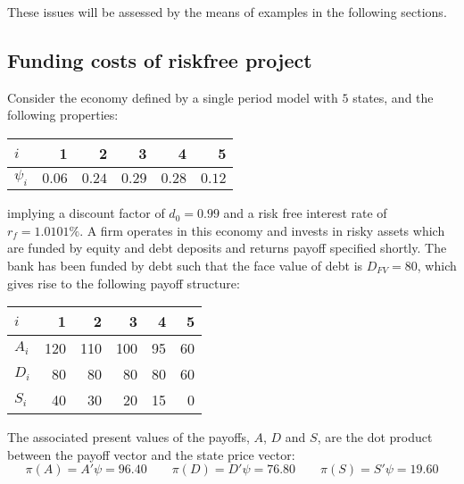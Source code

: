 \documentclass[../main.tex]{subfiles}
\begin{document}
        These issues will be assessed by the means of examples in the following sections.

    \subsection{Funding costs of riskfree project}
        Consider the economy defined by a single period model with $5$ states, and the following properties:
            \begin{table}[H]
                \centering
                \begin{tabular}{l|rrrrr}
                    $i$ & 1 & 2 & 3 & 4 & 5 \\
                    \hline
                    $\psi_{i}$ & $0.06$ & $0.24$ & $0.29$ & $0.28$ & $0.12$ \\
                \end{tabular}
            \end{table}
        implying a discount factor of $d_{0} = 0.99$ and a risk free interest rate of $r_{f} = 1.0101\%$. A firm operates in this economy and invests in risky assets which are funded by equity and debt deposits and returns payoff specified shortly. The bank has been funded by debt such that the face value of debt is $D_{FV} = 80$, which gives rise to the following payoff structure:
        \begin{table}[H]
            \centering
            \begin{tabular}{l|rrrrr}
                $i$ & 1 & 2 & 3 & 4 & 5 \\
                \hline
                $A_{i}$ & 120 & 110 & 100 & 95 & 60 \\
                $D_{i}$ & 80 & 80 & 80 & 80 & 60 \\
                $S_{i}$ & 40 & 30 & 20 & 15 & 0
            \end{tabular}
        \end{table}
        The associated present values of the payoffs, $A$, $D$ and $S$, are the dot product between the payoff vector and the state price vector:
            \begin{equation}
                \pi(A) = A'\psi = 96.40
                \qquad \pi(D) = D'\psi = 76.80
                \qquad \pi(S) = S'\psi = 19.60
            \end{equation}
\end{document}
